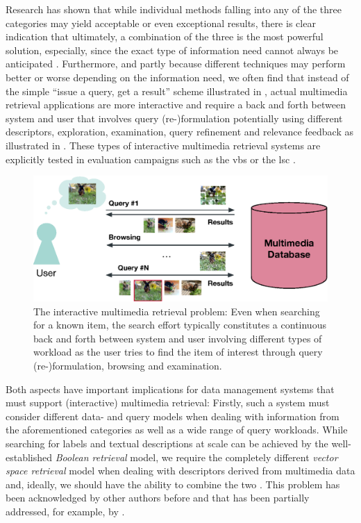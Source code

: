Research has shown that while individual methods falling into any of the three categories may yield acceptable or even exceptional results, there is clear indication that ultimately, a combination of the three is the most powerful solution, especially, since the exact type of information need cannot always be anticipated \cite{Rossetto:2020Interactive}. Furthermore, and partly because different techniques may perform better or worse depending on the information need, we often find that instead of the simple ``issue a query, get a result'' scheme illustrated in , actual multimedia retrieval applications are more interactive and require a back and forth between system and user \cite{Lokovc:2022Task} that involves query (re-)formulation potentially using different descriptors, exploration, examination, query refinement and relevance feedback \cite{Lokovc:2019Interactive,Gurrin:2019Invited} as illustrated in . These types of interactive multimedia retrieval systems are explicitly tested in evaluation campaigns such as the \acrfull{vbs} \cite{Schoeffmann:2019Video} or the \acrfull{lsc} \cite{Gurrin:2021Introduction}.

\begin{figure}[tb]
    \centering
    \includegraphics[width=\textwidth]{figures/mr-actual.eps}
    \caption{The interactive multimedia retrieval problem: Even when searching for a known item, the search effort typically constitutes a continuous back and forth between system and user involving different types of workload as the user tries to find the item of interest through query (re-)formulation, browsing and examination.}
    \label{figure:mr-actual}
\end{figure}
 
Both aspects have important implications for data management systems that must support (interactive) multimedia retrieval: Firstly, such a system must consider different data- and query models when dealing with information from the aforementioned categories as well as a wide range of query workloads. While searching for labels and textual descriptions at scale can be achieved by the well-established \emph{Boolean retrieval} model, we require the completely different \emph{vector space retrieval} model when dealing with descriptors derived from multimedia data and, ideally, we should have the ability to combine the two \cite{Heller:2020Multi}. This problem has been acknowledged by other authors before \cite{Jonsson:2016Ten} and that has been partially addressed, for example, by \cite{Giangreco:2018Database,Giangreco:2016Adam,Wang:2021Milvus}.

